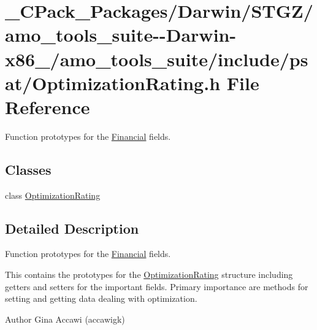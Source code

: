 \hypertarget{___c_pack___packages_2_darwin_2_s_t_g_z_2amo__tools__suite--_darwin-x86__64_2amo__tools__suite_22eee3c5eab8a16ff89910a69ef7793c2}{}\section{\+\_\+\+C\+Pack\+\_\+\+Packages/\+Darwin/\+S\+T\+G\+Z/amo\+\_\+tools\+\_\+suite-\/-\/\+Darwin-\/x86\+\_/amo\+\_\+tools\+\_\+suite/include/psat/\+Optimization\+Rating.h File Reference}
\label{___c_pack___packages_2_darwin_2_s_t_g_z_2amo__tools__suite--_darwin-x86__64_2amo__tools__suite_22eee3c5eab8a16ff89910a69ef7793c2}


Function prototypes for the \hyperlink{class_financial}{Financial} fields.  


\subsection*{Classes}
\begin{DoxyCompactItemize}
\item 
class \hyperlink{class_optimization_rating}{Optimization\+Rating}
\end{DoxyCompactItemize}


\subsection{Detailed Description}
Function prototypes for the \hyperlink{class_financial}{Financial} fields. 

This contains the prototypes for the \hyperlink{class_optimization_rating}{Optimization\+Rating} structure including getters and setters for the important fields. Primary importance are methods for setting and getting data dealing with optimization.

\begin{DoxyAuthor}{Author}
Gina Accawi (accawigk) 
\end{DoxyAuthor}

